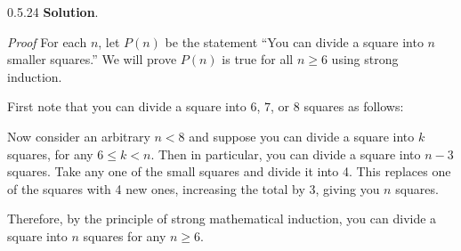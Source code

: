 \documentclass[11pt,]{book}
\makeatletter
\theoremstyle{ptxplainnotitle}
\theoremstyle{ptxplaintitle}
\renewcommand*{\proofname}{Proof}
\renewenvironment{proof}[1][\proofname]{\par
  \pushQED{\qed}%
  \normalfont \topsep6\p@\@plus6\p@\relax
  \trivlist
  \item\relax
    {\itshape
    #1\@addpunct{.}}\hspace\labelsep\ignorespaces
}{%
  \popQED\endtrivlist\@endpefalse
}
\theoremstyle{ptxdefinitionnotitle}
\theoremstyle{ptxdefinitiontitle}
\theoremstyle{ptxdefinitionnotitle}
\theoremstyle{ptxdefinitiontitle}
\theoremstyle{ptxdefinitionnotitle}
\theoremstyle{ptxdefinitiontitle}
\theoremstyle{ptxdefinitiontitlenonumber}
\theoremstyle{ptxdefinitiontitlenonumber}
\numberwithin{equation}{chapter}
\newcommand{\lt}{<}
\makeatother
\begin{document}
\begin{divisionexercise}{0.5.24}
\textbf{Solution}.\quad%
\begin{proof}\hypertarget{proof-22}{}
\hypertarget{p-697}{}%
For each \(n\), let \(P(n)\) be the statement ``You can divide a square into \(n\) smaller squares.''  We will prove \(P(n)\) is true for all \(n \ge 6\) using strong induction.%
\par
\hypertarget{p-698}{}%
First note that you can divide a square into \(6\), \(7\), or \(8\) squares as follows:%
\begin{sidebyside}{3}{0.0166666666666667}{0.0166666666666667}{0.0333333333333333}
\begin{sbspanel}{0.3}
\end{sbspanel}
\begin{sbspanel}{0.3}
\end{sbspanel}
\begin{sbspanel}{0.3}
\end{sbspanel}
\end{sidebyside}
\par
\hypertarget{p-699}{}%
Now consider an arbitrary \(n \lt 8\) and suppose you can divide a square into \(k\) squares, for any \(6 \le k \lt n\).  Then in particular, you can divide a square into \(n-3\) squares.  Take any one of the small squares and divide it into 4.  This replaces one of the squares with 4 new ones, increasing the total by 3, giving you \(n\) squares.%
\par
\hypertarget{p-700}{}%
Therefore, by the principle of strong mathematical induction, you can divide a square into \(n\) squares for any \(n \ge 6\).%
\end{proof}
\end{divisionexercise}%
\end{document}
